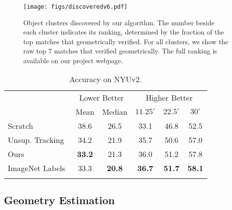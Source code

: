 \documentclass[10pt,twocolumn,letterpaper]{article}
\begin{document}
\begin{figure*}
\begin{center}
   \texttt{[image: figs/discoveredv6.pdf]}
\end{center}
\vspace{-0.1in}
   \caption{Object clusters discovered by our algorithm.  The number beside each cluster indicates its ranking, determined by the fraction of the top matches that geometrically verified.  %
   For all clusters, we show the raw top 7 matches that verified geometrically.  
   The full ranking is available on our project webpage.}
   \vspace{-0.2in}
\label{fig:discovered}
\end{figure*}

\begin{table}

\setlength{\tabcolsep}{3pt}
\center
{}
\begin{tabular}{l c c c c c}
\Xhline{2\arrayrulewidth}
 &\multicolumn{2}{c}{Lower Better} & \multicolumn{3}{c}{Higher Better}\\
& Mean & Median & $11.25^{\circ}$ & $22.5^{\circ}$ & $30^{\circ}$\\
\hline
Scratch & 38.6 & 26.5 & 33.1 & 46.8 & 52.5 \\
Unsup. Tracking~\cite{wang2015unsupervised} & 34.2 & 21.9 & 35.7 & 50.6 & 57.0 \\
Ours & \textbf{33.2} & 21.3 & 36.0 & 51.2 & 57.8 \\
ImageNet Labels & 33.3 & \textbf{20.8} & \textbf{36.7} & \textbf{51.7} & \textbf{58.1} \\
\Xhline{2\arrayrulewidth}
\end{tabular}
\vspace{.05cm}
\caption{Accuracy on NYUv2.}
\label{tab:surf_norm}
\vspace{-.25cm}

\end{table}

\vspace{-0.05in}
\subsection{Geometry Estimation}
\vspace{-0.05in}
\end{document}
